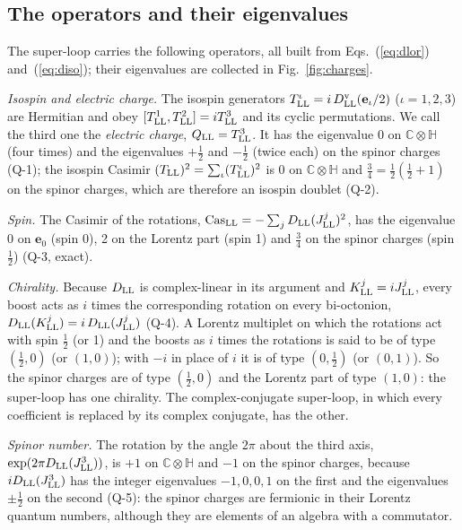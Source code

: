 \subsection{The operators and their eigenvalues}

The super-loop carries the following operators, all built from Eqs.~(\ref{eq:dlor})
and~(\ref{eq:diso}); their eigenvalues are collected in Fig.~\ref{fig:charges}.

\emph{Isospin and electric charge.} The isospin generators $T^\iota_{\rm LL}=i\,D^{\rm v}_{\rm
LL}(\mathbf e_\iota/2)$ ($\iota=1,2,3$) are Hermitian and obey $[T^1_{\rm LL},T^2_{\rm LL}]=iT^3_{\rm
LL}$ and its cyclic permutations. We call the third one the \emph{electric charge},
$Q_{\rm LL}=T^3_{\rm LL}$. It has the eigenvalue 0 on $\mathbb C\otimes\mathbb H$ (four times) and the
eigenvalues $+\tfrac12$ and $-\tfrac12$ (twice each) on the spinor charges (Q-1); the isospin Casimir
$(T_{\rm LL})^2=\sum_\iota(T^\iota_{\rm LL})^2$ is 0 on $\mathbb C\otimes\mathbb H$ and
$\tfrac34=\tfrac12(\tfrac12+1)$ on the spinor charges, which are therefore an isospin doublet (Q-2).

\emph{Spin.} The Casimir of the rotations, $\mathrm{Cas}_{\rm LL}=-\sum_jD_{\rm LL}(J^j_{\rm LL})^2$, has
the eigenvalue 0 on $\mathbf e_0$ (spin 0), 2 on the Lorentz part (spin 1) and $\tfrac34$ on the
spinor charges (spin $\tfrac12$) (Q-3, exact).

\emph{Chirality.} Because $D_{\rm LL}$ is complex-linear in its argument and $K^j_{\rm LL}=iJ^j_{\rm
LL}$, every boost acts as $i$ times the corresponding rotation on every bi-octonion,
$D_{\rm LL}(K^j_{\rm LL})=i\,D_{\rm LL}(J^j_{\rm LL})$ (Q-4). A Lorentz multiplet on which the rotations
act with spin $\tfrac12$ (or 1) and the boosts as $i$ times the rotations is said to be of type
$(\tfrac12,0)$ (or $(1,0)$); with $-i$ in place of $i$ it is of type $(0,\tfrac12)$ (or $(0,1)$). So the
spinor charges are of type $(\tfrac12,0)$ and the Lorentz part of type $(1,0)$: the super-loop has one
chirality. The complex-conjugate super-loop, in which every coefficient is replaced by its complex
conjugate, has the other.

\emph{Spinor number.} The rotation by the angle $2\pi$ about the third axis, $\exp(2\pi D_{\rm
LL}(J^3_{\rm LL}))$, is $+1$ on $\mathbb C\otimes\mathbb H$ and $-1$ on the spinor charges, because
$iD_{\rm LL}(J^3_{\rm LL})$ has the integer eigenvalues $-1,0,0,1$ on the first and the eigenvalues
$\pm\tfrac12$ on the second (Q-5): the spinor charges are fermionic in their Lorentz quantum numbers,
although they are elements of an algebra with a commutator.

